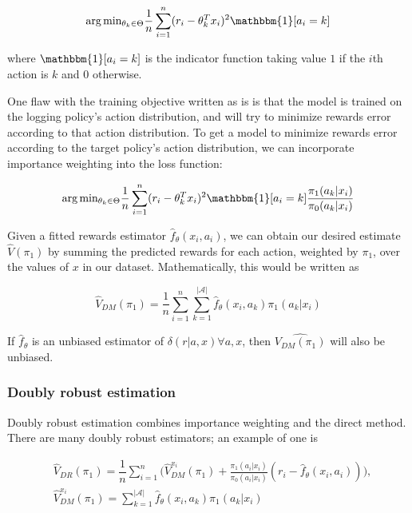 \documentclass[sigplan,screen]{acmart}
\begin{document}
\begin{align}
\text{arg}\,\text{min}_{\theta_k \in \Theta} \dfrac{1}{n} \sum_{i=1}^n (r_i - \theta^T_k x_i)^2\mathbbm{1}[a_i = k]
\end{align}

where $\mathbbm{1}[a_i = k]$ is the indicator function taking value $1$ if the $i$th action is $k$ and $0$ otherwise.

One flaw with the training objective written as is is that the model is trained on the logging policy's action distribution, and will try to minimize rewards error according to that action distribution. To get a model to minimize rewards error according to the target policy's action distribution, we can incorporate importance weighting into the loss function:

\begin{align}
\text{arg}\,\text{min}_{\theta_k \in \Theta} \dfrac{1}{n} \sum_{i=1}^n (r_i - \theta^T_k x_i)^2\mathbbm{1}[a_i = k] \dfrac{\pi_1(a_k|x_i)}{\pi_0(a_k|x_i)}
\end{align}

Given a fitted rewards estimator $\hat{f}_\theta(x_i, a_i)$, we can obtain our desired estimate $\hat{V}(\pi_1)$ by summing the predicted rewards for each action, weighted by $\pi_1$, over the values of $x$ in our dataset. Mathematically, this would be written as 

\begin{equation}
    \hat{V}_{DM}(\pi_1) = \dfrac{1}{n} \sum_{i=1}^n \sum_{k=1}^{|\mathcal{A}|} \hat{f}_\theta(x_i, a_k) \pi_1(a_k|x_i)
\end{equation}

If $\hat{f}_\theta$ is an unbiased estimator of $\delta(r|a,x) \forall a, x$, then $\hat{V_{DM}(\pi_1)}$ will also be unbiased. 

\subsubsection{Doubly robust estimation}
Doubly robust estimation combines importance weighting and the direct method. There are many doubly robust estimators; an example of one is 

\begin{align}
    &\hat{V}_{DR}(\pi_1) = \dfrac{1}{n} \sum_{i=1}^n\bigg(\hat{V}_{DM}^{x_i}(\pi_1) +  \frac{\pi_1(a_i|x_i)}{\pi_0(a_i|x_i)}(r_i - \hat{f}_\theta(x_i, a_i))\bigg), \\
    & \hat{V}_{DM}^{x_i}(\pi_1) = \sum_{k=1}^{|\mathcal{A}|} \hat{f}_\theta(x_i, a_k) \pi_1(a_k|x_i)
\end{align}
\end{document}
